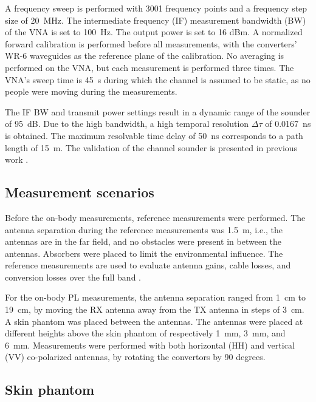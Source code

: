 \documentclass[preprint]{rsl}
\begin{document}
A frequency sweep is performed with 3001 frequency points and a frequency step size of 20~MHz. 
The intermediate frequency (IF) measurement bandwidth (BW) of the VNA is set to 100~Hz. 
The output power is set to 16 dBm.
A normalized forward calibration is performed before all measurements, with the converters' WR-6 waveguides as the reference plane of the calibration. 
No averaging is performed on the VNA, but each measurement is performed three times.
The VNA's sweep time is 45~s during which the channel is assumed to be static, as no people were moving during the measurements. 

The IF BW and transmit power settings result in a dynamic range of the sounder of 95~dB.
Due to the high bandwidth, a high temporal resolution $\Delta\tau$ of 0.0167~ns is obtained.
The maximum resolvable time delay of 50~ns corresponds to a path length of 15~m.
The validation of the channel sounder is presented in previous work \cite{DeBeelde2021_eucap}. 

\subsection{Measurement scenarios}

Before the on-body measurements, reference measurements were performed. 
The antenna separation during the reference measurements was 1.5~m, i.e., the antennas are in the far field, and no obstacles were present in between the antennas. 
Absorbers were placed to limit the environmental influence.
The reference measurements are used to evaluate antenna gains, cable losses, and conversion losses over the full band \cite{DeBeelde2021_eucap}. 

For the on-body PL measurements, the antenna separation ranged from 1~cm to 19~cm, by moving the RX antenna away from the TX antenna in steps of 3~cm.
A skin phantom was placed between the antennas. 
The antennas were placed at different heights above the skin phantom of respectively 1~mm, 3~mm, and 6~mm. 
Measurements were performed with both horizontal (HH) and vertical (VV) co-polarized antennas, by rotating the convertors by 90 degrees.

\subsection{Skin phantom}
\end{document}
